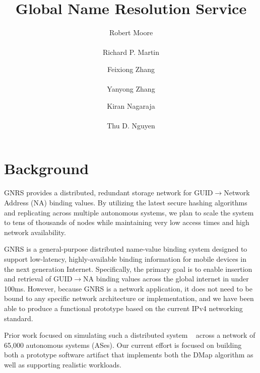 \documentclass[10pt]{article}
\title{Global Name Resolution Service}
\author{Robert Moore\\
\\
Richard P. Martin\\
\and
Feixiong Zhang\\
\\
Yanyong Zhang\\
\and
Kiran Nagaraja\\
\\
Thu D. Nguyen\\
}
\begin{document}
\maketitle

\section{Background}
GNRS provides a distributed, redundant storage network for
GUID$\rightarrow$Network Address (NA) binding values.  By utilizing the latest
secure hashing algorithms and replicating across multiple autonomous systems,
we plan  to scale the system to tens of thousands of nodes while maintaining
very low access times and high network availability.

GNRS is a general-purpose distributed name-value binding system designed to
support low-latency, highly-available binding information for mobile devices
in the next generation Internet.  Specifically, the primary goal is to enable
insertion and retrieval of GUID$\rightarrow$NA binding values across the
global internet in under 100ms.  However, because GNRS is a network
application, it does not need to be bound to any specific network architecture
or implementation, and we have been able to produce a functional prototype
based on the current IPv4 networking standard.

Prior work focused on simulating such a distributed system ~\cite{tamvu-dmap}
across a network of 65,000 autonomous systems (ASes).  Our current effort is
focused on building both a prototype software artifact that implements both
the DMap algorithm as well as supporting realistic workloads.  

%
%
%
\end{document}
